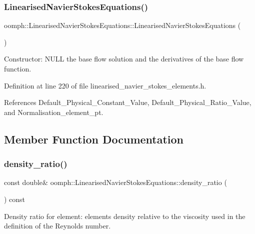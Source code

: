 \subsubsection{\texorpdfstring{Linearised\+Navier\+Stokes\+Equations()}{LinearisedNavierStokesEquations()}}
{\footnotesize\ttfamily oomph\+::\+Linearised\+Navier\+Stokes\+Equations\+::\+Linearised\+Navier\+Stokes\+Equations (\begin{DoxyParamCaption}{ }\end{DoxyParamCaption})\hspace{0.3cm}{\ttfamily [inline]}}



Constructor\+: N\+U\+LL the base flow solution and the derivatives of the base flow function. 



Definition at line 220 of file linearised\+\_\+navier\+\_\+stokes\+\_\+elements.\+h.



References Default\+\_\+\+Physical\+\_\+\+Constant\+\_\+\+Value, Default\+\_\+\+Physical\+\_\+\+Ratio\+\_\+\+Value, and Normalisation\+\_\+element\+\_\+pt.



\subsection{Member Function Documentation}
\mbox{\label{classoomph_1_1LinearisedNavierStokesEquations_af083925ee7128441ddc8b412a35fcb14}} 
\subsubsection{\texorpdfstring{density\+\_\+ratio()}{density\_ratio()}}
{\footnotesize\ttfamily const double\& oomph\+::\+Linearised\+Navier\+Stokes\+Equations\+::density\+\_\+ratio (\begin{DoxyParamCaption}{ }\end{DoxyParamCaption}) const\hspace{0.3cm}{\ttfamily [inline]}}



Density ratio for element\+: element\textquotesingle{}s density relative to the viscosity used in the definition of the Reynolds number. 



